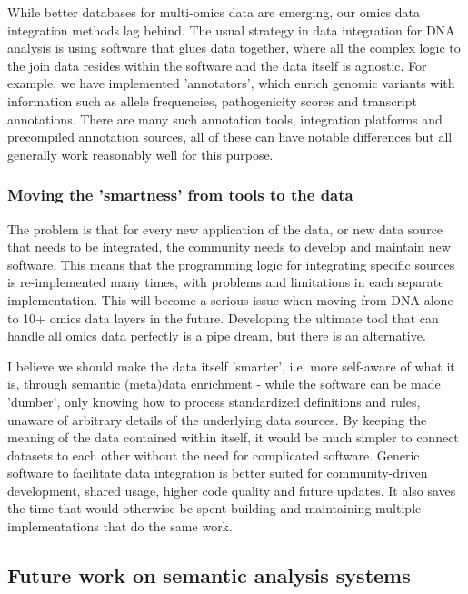 While better databases for multi-omics data are emerging, our omics data integration methods lag behind.
The usual strategy in data integration for DNA analysis is using software that glues data together, where all the complex logic to the join data resides within the software and the data itself is agnostic.
For example, we have implemented 'annotators', which enrich genomic variants with information such as allele frequencies, pathogenicity scores and transcript annotations\cite{van_der_Velde_2017}.
There are many such annotation tools\cite{Feng_2014}, integration platforms\cite{Pedersen_2016} and precompiled annotation sources\cite{Liu_2011}, all of these can have notable differences\cite{McCarthy_2014} but all generally work reasonably well for this purpose.

\subsubsection*{Moving the 'smartness' from tools to the data}

The problem is that for every new application of the data, or new data source that needs to be integrated, the community needs to develop and maintain new software.
This means that the programming logic for integrating specific sources is re-implemented many times, with problems and limitations in each separate implementation.
This will become a serious issue when moving from DNA alone to 10+ omics data layers in the future.
Developing the ultimate tool that can handle all omics data perfectly is a pipe dream, but there is an alternative.

I believe we should make the data itself 'smarter', i.e. more self-aware of what it is, through semantic (meta)data enrichment - while the software can be made 'dumber', only knowing how to process standardized definitions and rules, unaware of arbitrary details of the underlying data sources.
By keeping the meaning of the data contained within itself, it would be much simpler to connect datasets to each other without the need for complicated software.
Generic software to facilitate data integration is better suited for community-driven development, shared usage, higher code quality and future updates. 
It also saves the time that would otherwise be spent building and maintaining multiple implementations that do the same work.

\subsection{Future work on semantic analysis systems} \label{systemsection_semantic}

